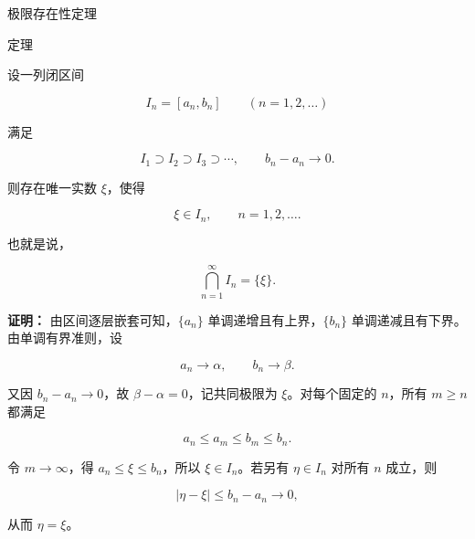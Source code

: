\documentclass[aspectratio=169,10pt,fontset=fandol]{ctexbeamer}
\begin{document}
\begin{frame}[t,fragile]{极限存在性定理}
\normalsize
\begin{block}{定理}
{\normalsize


设一列闭区间

\[

I_n=[a_n,b_n]\qquad(n=1,2,\ldots)

\]

满足

\[

I_1\supset I_2\supset I_3\supset\cdots,

\qquad b_n-a_n\to0.

\]

则存在唯一实数 \(\xi\)，使得

\[

\xi\in I_n,\qquad n=1,2,\ldots.

\]

也就是说，

\[

\bigcap_{n=1}^{\infty}I_n=\{\xi\}.

\]


}
\end{block}
\pause
{\normalsize
\textbf{证明：}
由区间逐层嵌套可知，\(\{a_n\}\) 单调递增且有上界，\(\{b_n\}\) 单调递减且有下界。由单调有界准则，设

\[

a_n\to\alpha,\qquad b_n\to\beta.

\]

又因 \(b_n-a_n\to0\)，故 \(\beta-\alpha=0\)，记共同极限为 \(\xi\)。对每个固定的 \(n\)，所有 \(m\ge n\) 都满足

\[

a_n\le a_m\le b_m\le b_n.

\]

令 \(m\to\infty\)，得 \(a_n\le\xi\le b_n\)，所以 \(\xi\in I_n\)。若另有 \(\eta\in I_n\) 对所有 \(n\) 成立，则

\[

|\eta-\xi|\le b_n-a_n\to0,

\]

从而 \(\eta=\xi\)。


}
\end{frame}
\end{document}

